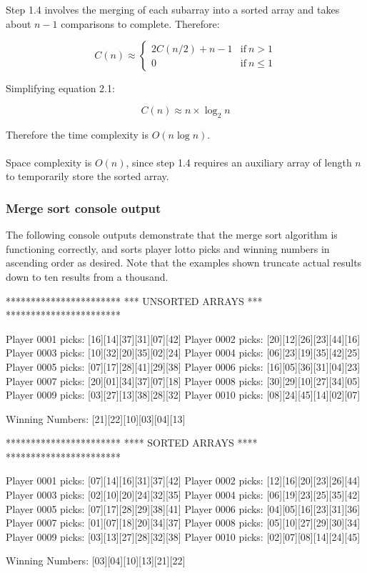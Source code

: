 Step 1.4 involves the merging of each subarray into a sorted array and takes about $n - 1$ comparisons to complete. Therefore:

\begin{equation}
C(n) \approx \left\{\begin{matrix}
2C(n/2) + n - 1 & \mbox{if} \ n > 1 \\ 
0 & \mbox{if} \ n \leq 1 
\end{matrix}\right.
\end{equation}

\newpage
\noindent
Simplifying equation 2.1:

\begin{equation}
C(n) \approx n \times \log_2n
\end{equation}

\noindent
Therefore the time complexity is $O(n \log n)$.
\\
\\
Space complexity is $O(n)$, since step 1.4 requires an auxiliary array of length $n$ to temporarily store the sorted array.

\subsubsection{Merge sort console output}

The following console outputs demonstrate that the merge sort algorithm is functioning correctly, and sorts player lotto picks and winning numbers in ascending order as desired. Note that the examples shown truncate actual results down to ten results from a thousand.
\\
\begin{consolecode}
***********************
*** UNSORTED ARRAYS ***
***********************

Player 0001 picks: [16][14][37][31][07][42]
Player 0002 picks: [20][12][26][23][44][16]
Player 0003 picks: [10][32][20][35][02][24]
Player 0004 picks: [06][23][19][35][42][25]
Player 0005 picks: [07][17][28][41][29][38]
Player 0006 picks: [16][05][36][31][04][23]
Player 0007 picks: [20][01][34][37][07][18]
Player 0008 picks: [30][29][10][27][34][05]
Player 0009 picks: [03][27][13][38][28][32]
Player 0010 picks: [08][24][45][14][02][07]

Winning Numbers:   [21][22][10][03][04][13]
\end{consolecode}

\begin{consolecode}
***********************
**** SORTED ARRAYS ****
***********************

Player 0001 picks: [07][14][16][31][37][42]
Player 0002 picks: [12][16][20][23][26][44]
Player 0003 picks: [02][10][20][24][32][35]
Player 0004 picks: [06][19][23][25][35][42]
Player 0005 picks: [07][17][28][29][38][41]
Player 0006 picks: [04][05][16][23][31][36]
Player 0007 picks: [01][07][18][20][34][37]
Player 0008 picks: [05][10][27][29][30][34]
Player 0009 picks: [03][13][27][28][32][38]
Player 0010 picks: [02][07][08][14][24][45]

Winning Numbers:   [03][04][10][13][21][22]
\end{consolecode}

